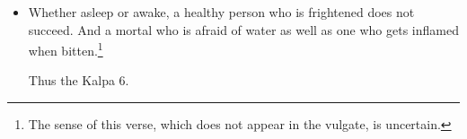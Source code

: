 \begin{translation}
\begin{itemize}
\item[5.7.63.1]

Whether asleep or awake, a healthy person who is frightened does not
succeed.  And a mortal who is afraid of water as well as one who gets
inflamed when bitten.\footnote{The sense of this verse, which does
    not appear in the vulgate, is uncertain.}

\bigskip

{\centering Thus the Kalpa 6.  \par}

\end{itemize}

    \end{translation}
\endinput




%

